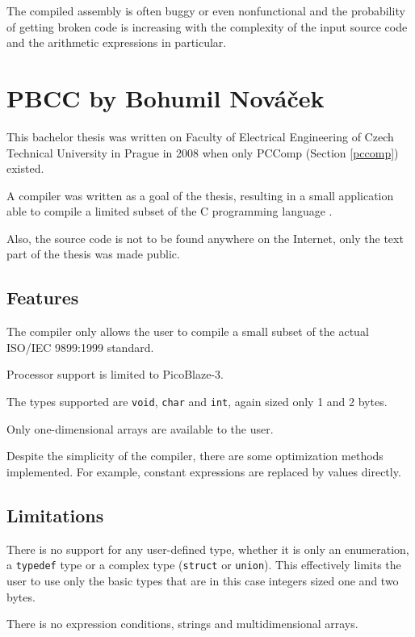         The compiled assembly is often buggy or even nonfunctional and the probability of getting broken code is increasing with the complexity of the input source code and the arithmetic expressions in particular.

    \section{PBCC by Bohumil Nováček}\label{not_quite_c}

    This bachelor thesis was written on Faculty of Electrical Engineering of Czech Technical University in Prague in  2008 when only PCComp (Section \ref{pccomp}) existed.

    A compiler was written as a goal of the thesis, resulting in a small application able to compile a limited subset of the C programming language \cite{PbccNovacek}.

    Also, the source code is not to be found anywhere on the Internet, only the text part of the thesis was made public.

        \subsection{Features}

        The compiler only allows the user to compile a small subset of the actual ISO/IEC 9899:1999 standard.

        Processor support is limited to PicoBlaze-3.

        The types supported are \texttt{void}, \texttt{char} and \texttt{int}, again sized only 1 and 2 bytes.

        Only one-dimensional arrays are available to the user.

        Despite the simplicity of the compiler, there are some optimization methods implemented. For example, constant expressions are replaced by values directly.

        \subsection{Limitations}

        There is no support for any user-defined type, whether it is only an enumeration, a \texttt{typedef} type or a complex type (\texttt{struct} or \texttt{union}). This effectively limits the user to use only the basic types that are in this case integers sized one and two bytes.

        There is no expression conditions, strings and multidimensional arrays.

